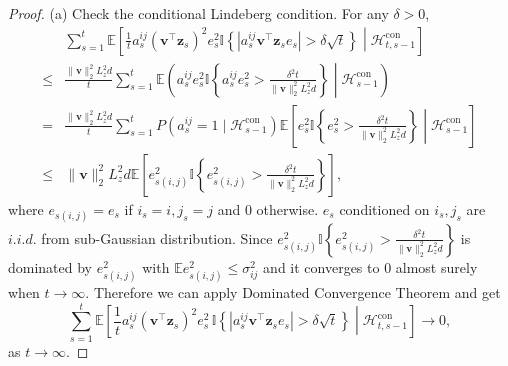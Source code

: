 \documentclass[12pt]{article}
\begin{document}
\begin{proof}
(a) Check the conditional Lindeberg condition. For any $\delta > 0$,
\begin{align*}
&\sum_{s=1}^t \mathbb{E} \left[ \frac{1}{t} a_s^{ij} (\bm{v}^\top \bm{z}_s)^2 e_s^2 \mathbb{I} \left\{ |a_s^{ij} \bm{v}^\top \bm{z}_s e_s| > \delta \sqrt{t} \right\} \middle| \mathcal{H}^{\mathrm{con}}_{t, s-1} \right] \\
\le & \frac{\|\bm{v}\|_2^2 L_z^2 d}{t} \sum_{s=1}^t \mathbb{E} \left( a_s^{ij} e_s^2 \mathbb{I} \left\{ a_s^{ij} e_s^2 > \frac{\delta^2 t}{\|\bm{v}\|_2^2 L_z^2 d} \right\} \middle| \mathcal{H}^{\mathrm{con}}_{s-1} \right) \\
= & \frac{\|\bm{v}\|_2^2 L_z^2 d}{t} \sum_{s=1}^t P(a_s^{ij} = 1 \mid \mathcal{H}^{\mathrm{con}}_{s-1}) \mathbb{E} \left[ e_s^2 \mathbb{I} \left\{e_s^2 > \frac{\delta^2 t}{\|\bm{v}\|_2^2 L_z^2 d} \right\} \middle| \mathcal{H}^{\mathrm{con}}_{s-1} \right] \\
\le & \|\bm{v}\|_2^2 L_z^2 d \mathbb{E} \left[ e_{s(i,j)}^2 \mathbb{I} \left\{ e_{s(i,j)}^2 > \frac{\delta^2 t}{\|\bm{v}\|_2^2 L_z^2 d} \right\} \right],
\end{align*}
where $e_{s(i,j)}=e_s$ if $i_s=i,j_s=j$ and 0 otherwise. $e_s$ conditioned on $i_s,j_s$ are $i.i.d.$ from sub-Gaussian distribution. Since $e_{s(i,j)}^2 \mathbb I \left\{ e_{s(i,j)}^2 > \frac{\delta^2 t}{\|\bm{v}\|_2^2 L_z^2 d} \right\}$ is dominated by $e_{s(i,j)}^2$ with $\mathbb{E} e_{s(i,j)}^2 \le \sigma_{ij}^2$ and it converges to 0 almost surely when \( t \to \infty \). Therefore we can apply Dominated Convergence Theorem and get 
\[
\sum_{s=1}^t \mathbb{E} \left[ \frac{1}{t} a_s^{ij} (\bm{v}^\top \bm{z}_s)^2 e_s^2 \, \mathbb I \left\{ |a_s^{ij} \bm{v}^\top \bm{z}_s e_s| > \delta \sqrt{t} \right\} \middle| \mathcal{H}^{\mathrm{con}}_{t,s-1} \right] \to 0,
\]
as $t \to \infty$.


\end{proof}
\end{document}
